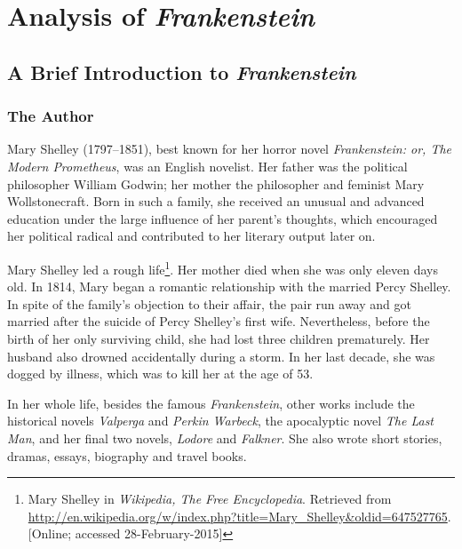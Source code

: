 \chapter{Analysis of \textit{Frankenstein}} %
\label{cha:analysis_of_frankenstein}
\section{A Brief Introduction to \textit{Frankenstein}} %
\label{sec:a_brief_introduction_to_frankenstein}
\secspacesubsec
\subsection{The Author} %
\label{sub:the_author}
\begin{text}

Mary Shelley (1797--1851), best known for her horror novel \textit{Frankenstein: or, The Modern Prometheus}, was an English novelist. Her father was the political philosopher William Godwin; her mother the philosopher and feminist Mary Wollstonecraft. Born in such a family, she received an unusual and advanced education under the large influence of her parent's thoughts, which encouraged her political radical and contributed to her literary output later on.

Mary Shelley led a rough life\footnote{Mary Shelley in \textit{Wikipedia{,} The Free Encyclopedia}. Retrieved from \url{http://en.wikipedia.org/w/index.php?title=Mary_Shelley&oldid=647527765}. [Online; accessed 28-February-2015]}. Her mother died when she was only eleven days old. In 1814, Mary began a romantic relationship with the married Percy Shelley. In spite of the family's objection to their affair, the pair run away and got married after the suicide of Percy Shelley's first wife. Nevertheless, before the birth of her only surviving child, she had lost three children prematurely. Her husband also drowned accidentally during a storm. In her last decade, she was dogged by illness, which was to kill her at the age of 53.

In her whole life, besides the famous \textit{Frankenstein}, other works include the historical novels \textit{Valperga} and \textit{Perkin Warbeck}, the apocalyptic novel \textit{The Last Man}, and her final two novels, \textit{Lodore} and \textit{Falkner}.
She also wrote short stories, dramas, essays, biography and travel books.

\end{text}
